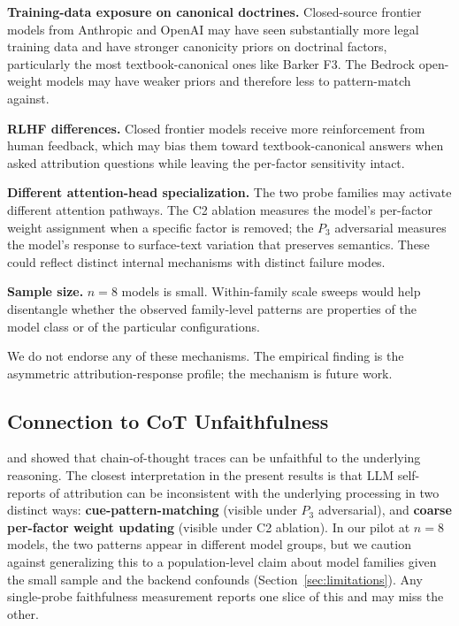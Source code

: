 \documentclass[11pt]{article}
\begin{document}
\textbf{Training-data exposure on canonical doctrines.} Closed-source frontier models from Anthropic and OpenAI may have seen substantially more legal training data and have stronger canonicity priors on doctrinal factors, particularly the most textbook-canonical ones like Barker F3. The Bedrock open-weight models may have weaker priors and therefore less to pattern-match against.

\textbf{RLHF differences.} Closed frontier models receive more reinforcement from human feedback, which may bias them toward textbook-canonical answers when asked attribution questions while leaving the per-factor sensitivity intact.

\textbf{Different attention-head specialization.} The two probe families may activate different attention pathways. The C2 ablation measures the model's per-factor weight assignment when a specific factor is removed; the $P_3$ adversarial measures the model's response to surface-text variation that preserves semantics. These could reflect distinct internal mechanisms with distinct failure modes.

\textbf{Sample size.} $n = 8$ models is small. Within-family scale sweeps would help disentangle whether the observed family-level patterns are properties of the model class or of the particular configurations.

We do not endorse any of these mechanisms. The empirical finding is the asymmetric attribution-response profile; the mechanism is future work.

\subsection{Connection to CoT Unfaithfulness}

\citet{turpin2023} and \citet{lanham2023} showed that chain-of-thought traces can be unfaithful to the underlying reasoning. The closest interpretation in the present results is that LLM self-reports of attribution can be inconsistent with the underlying processing in two distinct ways: \textbf{cue-pattern-matching} (visible under $P_3$ adversarial), and \textbf{coarse per-factor weight updating} (visible under C2 ablation). In our pilot at $n = 8$ models, the two patterns appear in different model groups, but we caution against generalizing this to a population-level claim about model families given the small sample and the backend confounds (Section~\ref{sec:limitations}). Any single-probe faithfulness measurement reports one slice of this and may miss the other.
\end{document}
